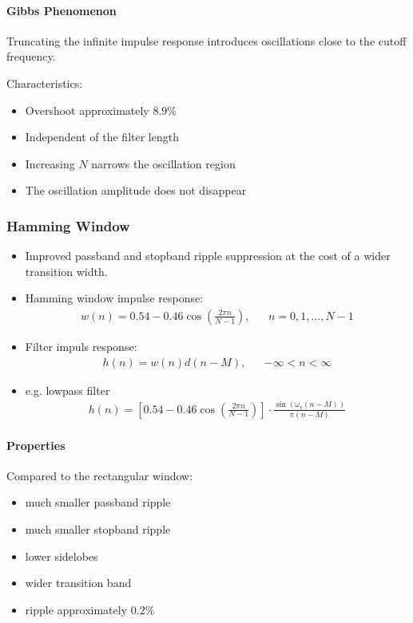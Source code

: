 \paragraph{Gibbs Phenomenon}

Truncating the infinite impulse response introduces oscillations close
to the cutoff frequency.

Characteristics:

\begin{itemize}
\item Overshoot approximately $8.9\%$
\item Independent of the filter length
\item Increasing $N$ narrows the oscillation region
\item The oscillation amplitude does not disappear
\end{itemize}

\subsubsection{Hamming Window}
\begin{itemize}
	\item Improved passband and stopband ripple suppression at the cost of a wider transition width.
	\item Hamming window impulse response:
	\begin{align*}
		w(n) = 0.54 -0.46\cos\left(\frac{2\pi n}{N-1}\right),&&n= 0,1,\dots,N-1
	\end{align*}
	\item Filter impuls response:
	\begin{align*}
		h(n) = w(n)d(n-M),&&-\infty < n < \infty
	\end{align*}
	\item e.g. lowpass filter
	\begin{align*}
		h(n) = \left[0.54 -0.46\cos\left(\frac{2\pi n}{N-1}\right)\right]\cdot\frac{\sin(\omega_c(n-M))}{\pi (n-M)}
	\end{align*}
\end{itemize}

\paragraph{Properties}

Compared to the rectangular window:

\begin{itemize}
\item much smaller passband ripple
\item much smaller stopband ripple
\item lower sidelobes
\item wider transition band
\item ripple approximately $0.2\%$
\end{itemize}

